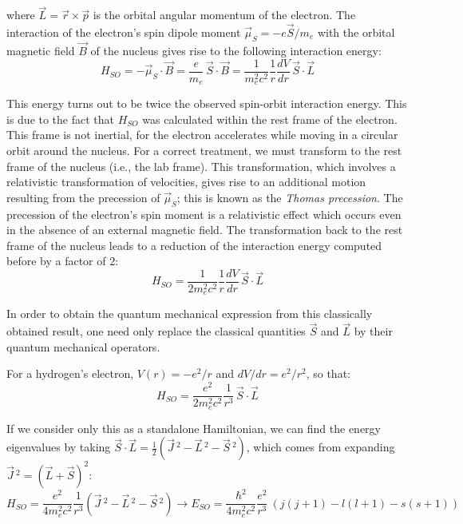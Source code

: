 where $\vec{L} = \vec{r}\times \vec{p}$ is the orbital angular momentum of the electron. The interaction of the electron's spin dipole moment $\vec{\mu}_S = -e\vec{S}/m_e$ with the orbital magnetic field $\vec{B}$ of the nucleus gives rise to the following interaction energy:
\begin{equation}
    H_{SO} = -\vec{\mu}_S \cdot \vec{B} = \frac{e}{m_e}\,\vec{S}\cdot \vec{B} = \frac{1}{m_e^2c^2}\frac{1}{r} \frac{dV}{dr}\,\vec{S}\cdot \vec{L}
\end{equation}

This energy turns out to be twice the observed spin-orbit interaction energy. This is due to the fact that $H_{SO}$ was calculated within the rest frame of the electron. This frame is not inertial, for the electron accelerates while moving in a circular orbit around the nucleus. For a correct treatment, we must transform to the rest frame of the nucleus (i.e., the lab frame). This transformation, which involves a relativistic transformation of velocities, gives rise to an additional motion resulting from the precession of $\vec{\mu}_S$; this is known as the \textit{Thomas precession}. The precession of the electron's spin moment is a relativistic effect which occurs even in the absence of an external magnetic field. The transformation back to the rest frame of the nucleus leads to a reduction of the interaction energy computed before by a factor of $2$:
\begin{equation}
    H_{SO} = \frac{1}{2m_e^2c^2}\frac{1}{r} \frac{dV}{dr}\,\vec{S}\cdot \vec{L}
\end{equation}

In order to obtain the quantum mechanical expression from this classically obtained result, one need only replace the classical quantities $\vec{S}$ and $\vec{L}$ by their quantum mechanical operators.

For a hydrogen's electron, $V(r)=-e^2/r$ and $dV/dr=e^2/r^2$, so that:
\begin{equation}
    H_{SO} = \frac{e^2}{2m_e^2c^2}\frac{1}{r^3}\,\vec{S}\cdot \vec{L}
\end{equation}

If we consider only this as a standalone Hamiltonian, we can find the energy eigenvalues by taking $\vec{S}\cdot \vec{L} = \frac{1}{2}(\vec{J}\,^2 - \vec{L}\,^2 - \vec{S}\,^2)$, which comes from expanding $\vec{J}\,^2 = (\vec{L}+\vec{S})^2$:
\begin{equation}
    H_{SO} = \frac{e^2}{4m_e^2c^2}\frac{1}{r^3}(\vec{J}\,^2 - \vec{L}\,^2 - \vec{S}\,^2) \longrightarrow E_{SO} = \frac{\hbar^2}{4m_e^2c^2}\frac{e^2}{r^3}\ (j(j+1)-l(l+1)-s(s+1))
\end{equation}

